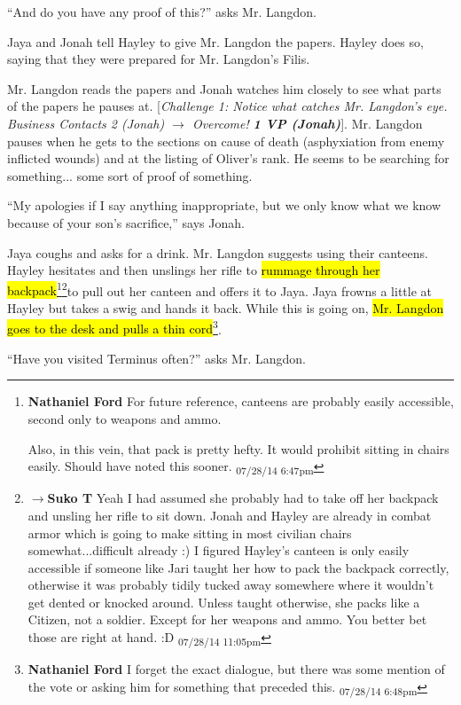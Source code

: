 ``And do you have any proof of this?'' asks Mr. Langdon.

Jaya and Jonah tell Hayley to give Mr. Langdon the papers.  Hayley does so, saying that they were prepared for Mr. Langdon's Filis.

Mr. Langdon reads the papers and Jonah watches him closely to see what parts of the papers he pauses at.  {[}\textit{Challenge 1:  Notice what catches Mr. Langdon's eye. Business Contacts 2 (Jonah) $\rightarrow$ Overcome! }\textit{\textbf{1 VP (Jonah)}}{]}.  Mr. Langdon pauses when he gets to the sections on cause of death (asphyxiation from enemy inflicted wounds) and at the listing of Oliver's rank.  He seems to be searching for something... some sort of proof of something.

``My apologies if I say anything inappropriate, but we only know what we know because of your son's sacrifice,'' says Jonah.

Jaya coughs and asks for a drink.  Mr. Langdon suggests using their canteens.  Hayley hesitates and then unslings her rifle to \hl{rummage through her backpack}\footnote{\textbf{Nathaniel Ford }For future reference, canteens are probably easily accessible, second only to weapons and ammo.

Also, in this vein, that pack is pretty hefty. It would prohibit sitting in chairs easily. Should have noted this sooner. \textsubscript{07/28/14 6:47pm}}\footnote{$\rightarrow$\textbf{Suko T }Yeah I had assumed she probably had to take off her backpack and unsling her rifle to sit down.  Jonah and Hayley are already in combat armor which is going to make sitting in most civilian chairs somewhat...difficult already :)  I figured Hayley's canteen is only easily accessible if someone like Jari taught her how to pack the backpack correctly, otherwise it was probably tidily tucked away somewhere where it wouldn't get dented or knocked around.  Unless taught otherwise, she packs like a Citizen, not a soldier.  Except for her weapons and ammo.  You better bet those are right at hand. :D \textsubscript{07/28/14 11:05pm}}to pull out her canteen and offers it to Jaya.  Jaya frowns a little at Hayley but takes a swig and hands it back.  While this is going on, \hl{Mr. Langdon goes to the desk and pulls a thin cord}\footnote{\textbf{Nathaniel Ford }I forget the exact dialogue, but there was some mention of the vote or asking him for something that preceded this. \textsubscript{07/28/14 6:48pm}}.

``Have you visited Terminus often?'' asks Mr. Langdon.

